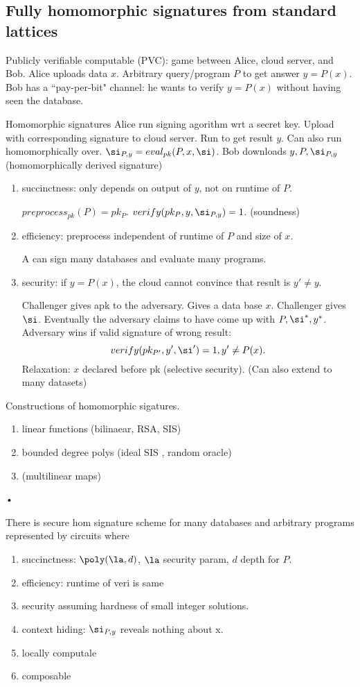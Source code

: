 \subsection{Fully homomorphic signatures from standard lattices}

Publicly verifiable computable (PVC): game between Alice, cloud server, and Bob. Alice uploads data $x$.
Arbitrary query/program $P$ to get answer $y=P(x)$. Bob has a ``pay-per-bit" channel: he wants to verify $y=P(x)$ without having seen the database.

Homomorphic signatures %
Alice run signing agorithm wrt a secret key. Upload with corresponding signature to cloud server. Run to get result $y$. Can also run homomorphically over. $\si_{P,y}=eval_{pk}(P,x,\si)$. Bob downloads $y,P,\si_{P,y}$ (homomorphically derived signature)

\begin{enumerate}
\item
succinctness: only depends on output of $y$, not on runtime of $P$.

$preprocess_{pk}(P)=pk_P$. $verify(pk_P,y,\si_{P,y})=1$. (soundness)
\item efficiency: preprocess independent of runtime of $P$ and size of $x$.

A can sign many databases and evaluate many programs.
\item security: if $y=P(x)$, the cloud cannot convince that result is $y'\ne y$.

Challenger gives  apk to the adversary. Gives a data base $x$. Challenger gives $\si$. Eventually the adversary claims to have come up with $P,\si^*,y^*$. Adversary wins if valid signature of wrong result:
\[
verify(pk_{P'},y',\si')=1,y'\ne P(x).
\]
Relaxation: $x$ declared before pk (selective security). (Can also extend to many datasets)
\end{enumerate}

Constructions of homomorphic sigatures. 
\begin{enumerate}
\item
linear functions (bilinaear, RSA, SIS)
\item
bounded degree polys (ideal SIS , random oracle)
\item
(multilinear maps)
\end{enumerate}•

There is secure hom signature scheme for many databases and arbitrary programs represented by circuits where 
\begin{enumerate}
\item
succinctness: $\poly(\la,d)$, $\la$ security param, $d$ depth for $P$.
\item
efficiency: runtime of veri is same
\item
security assuming hardness of small integer solutions. 
\item context hiding: $\si_{P,y}$ reveals nothing about x.
\item locally computale
\item composable
\end{enumerate}

